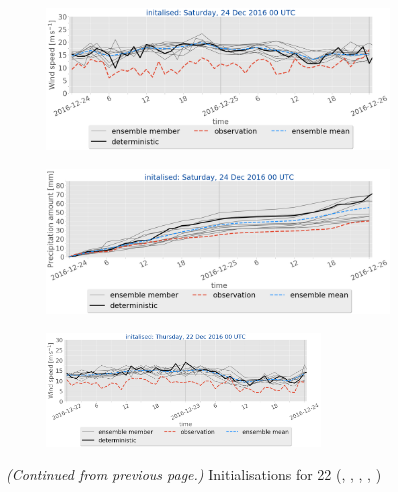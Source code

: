 \begin{figure}
	\begin{subfigure}[b]{0.49\textwidth}
		\includegraphics[trim={0.cm 5.cm 0cm 0cm},clip,
		width=\textwidth]{./fig_sfc_ws/20161224_00}
		\caption{}\label{fig:res:sfc_ws24}
	\end{subfigure}
	
	\begin{subfigure}[b]{0.49\textwidth}
		\includegraphics[trim={0.cm 3.6cm 0cm 0cm},clip,
		width=\textwidth]{./fig_sfc_precip/20161224_00}
		\caption{}\label{fig:res:sfc_precip24}
	\end{subfigure}
	
	\begin{subfigure}[b]{\textwidth}
		\centering
		\includegraphics[trim={5.5cm 0cm 5.cm 17.2cm},clip,
		width=0.8\textwidth]{./fig_sfc_ws/20161222_00}
	\end{subfigure}
	\caption{\textit{(Continued from previous page.)} Initialisations for \SI{22}{\dec} (\protect{}, \protect{}, \protect{}, \protect{}, \protect{})}
\end{figure}
